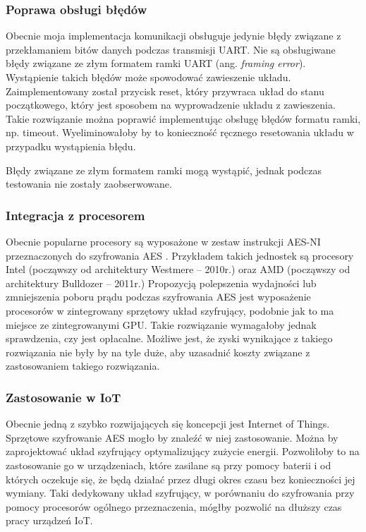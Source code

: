 \subsubsection{Poprawa obsługi błędów}
Obecnie moja implementacja komunikacji obsługuje jedynie błędy związane z przekłamaniem bitów danych podczas transmisji UART. Nie są obsługiwane błędy związane ze złym formatem ramki UART (ang. \textit{framing error}). Wystąpienie takich błędów może spowodować zawieszenie układu. Zaimplementowany został przycisk reset, który przywraca układ do stanu początkowego, który jest sposobem na wyprowadzenie układu z zawieszenia. Takie rozwiązanie można poprawić implementując obsługę błędów formatu ramki, np. timeout. Wyeliminowałoby by to konieczność ręcznego resetowania układu w przypadku wystąpienia błędu.

Błędy związane ze złym formatem ramki mogą wystąpić, jednak podczas testowania nie zostały zaobserwowane.

\subsubsection{Integracja z procesorem}
Obecnie popularne procesory są wyposażone w zestaw instrukcji AES-NI przeznaczonych do szyfrowania AES \cite{aes-processors}. Przykładem takich jednostek są procesory Intel (począwszy od architektury Westmere -- 2010r.) oraz AMD (począwszy od architektury Bulldozer -- 2011r.) Propozycją polepszenia wydajności lub zmniejszenia poboru prądu podczas szyfrowania AES jest wyposażenie procesorów w zintegrowany sprzętowy układ szyfrujący, podobnie jak to ma miejsce ze zintegrowanymi GPU. Takie rozwiązanie wymagałoby jednak sprawdzenia, czy jest opłacalne. Możliwe jest, że zyski wynikające z takiego rozwiązania nie były by na tyle duże, aby uzasadnić koszty związane z zastosowaniem takiego rozwiązania.

\subsubsection{Zastosowanie w IoT}
Obecnie jedną z szybko rozwijających się koncepcji jest Internet of Things. Sprzętowe szyfrowanie AES mogło by znaleźć w niej zastosowanie. Można by zaprojektować układ szyfrujący optymalizujący zużycie energii. Pozwoliłoby to na zastosowanie go w urządzeniach, które zasilane są przy pomocy baterii i od których oczekuje się, że będą działać przez długi okres czasu bez konieczności jej wymiany. Taki dedykowany układ  szyfrujący, w porównaniu do szyfrowania przy pomocy procesorów ogólnego przeznaczenia, mógłby pozwolić na dłuższy czas pracy urządzeń IoT.